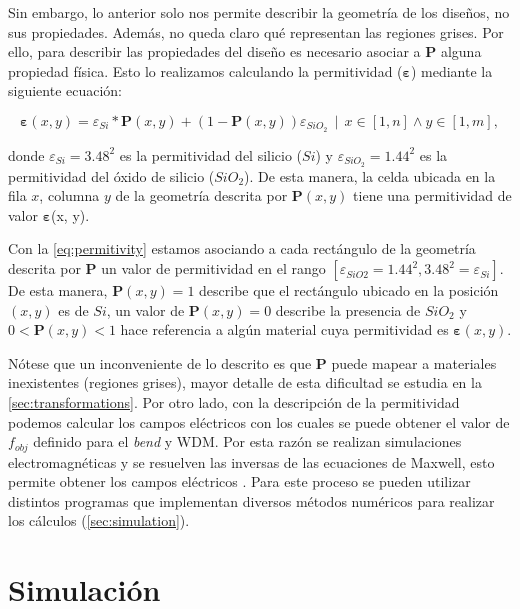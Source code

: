 Sin embargo, lo anterior solo nos permite describir la geometría de los diseños, no sus propiedades.
Además, no queda claro qué representan las regiones grises.
Por ello, para describir las propiedades del diseño es necesario asociar a $\boldsymbol{P}$ alguna propiedad física.
Esto lo realizamos calculando la permitividad ($\boldsymbol{\varepsilon}$) mediante la siguiente ecuación:

\begin{equation}
  \boldsymbol{\varepsilon}(x, y) = \varepsilon_{Si} * \boldsymbol{P}(x, y) + (1 - \boldsymbol{P}(x, y))
  \varepsilon_{SiO_2} \, \mid \, x \in [1, n] \land y \in [1, m],
\label{eq:permitivity}
\end{equation}

\noindent donde $\varepsilon_{Si} = 3.48^2$ es la permitividad del silicio ($Si$) y
$\varepsilon_{SiO_2} = 1.44^2$ es la permitividad del óxido de silicio ($SiO_2$).
De esta manera, la celda ubicada en la fila $x$, columna $y$ de la geometría descrita por 
$\boldsymbol{P}(x, y)$ tiene una permitividad de valor $\boldsymbol{\varepsilon}$(x, y).

Con la \autoref{eq:permitivity} estamos asociando a cada rectángulo de la geometría descrita por
$\boldsymbol{P}$ un valor de permitividad en el rango 
$[\varepsilon_{SiO2} = 1.44^2, 3.48^2 = \varepsilon_{Si}]$.
De esta manera, $\boldsymbol{P}(x, y) = 1$ describe que el rectángulo ubicado en la posición $(x, y)$ es de
$Si$,
un valor de $\boldsymbol{P}(x, y) = 0$ describe la presencia de $SiO_2$ y 
$0 < \boldsymbol{P}(x, y) < 1$ hace referencia
a algún material cuya permitividad es $\boldsymbol{\varepsilon}(x, y)$.

Nótese que un inconveniente de lo descrito es que $\boldsymbol{P}$ puede mapear a materiales inexistentes
(regiones grises),
mayor detalle de esta dificultad se estudia
en la \autoref{sec:transformations}.
Por otro lado, con la descripción de la permitividad podemos calcular los campos eléctricos con los
cuales se puede obtener el valor de $f_{obj}$ definido para el \emph{bend} y WDM.
Por esta razón se realizan simulaciones electromagnéticas y se resuelven las inversas de las 
ecuaciones de Maxwell, esto permite obtener los campos eléctricos \citep{Su2020}.
Para este proceso se pueden utilizar distintos programas que implementan diversos
métodos numéricos para realizar los cálculos (\autoref{sec:simulation}).

\section{Simulación}\label{sec:simulation}

